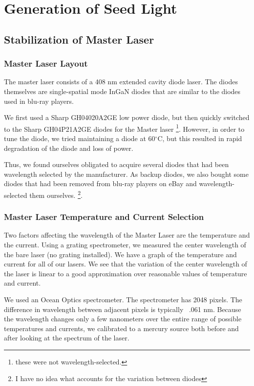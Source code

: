 \chapter{Generation of Seed Light}

\section{Stabilization of Master Laser}
\subsection{Master Laser Layout}
The master laser consists of a 408 nm extended cavity diode laser. The diodes themselves are single-spatial mode InGaN diodes that are similar to the diodes used in blu-ray players.

We first used a Sharp GH04020A2GE low power diode, but then quickly switched to the Sharp GH04P21A2GE diodes for the Master laser \footnote{these were not wavelength-selected.}. However, in order to tune the diode, we tried maintaining a diode at 60$^\circ$C, but this resulted in rapid degradation of the diode and loss of power. 

Thus, we found ourselves obligated to acquire several diodes that had been wavelength selected by the manufacturer. As backup diodes, we also bought some diodes that had been removed from blu-ray players on eBay and wavelength-selected them ourselves. \footnote{I have no idea what accounts for the variation between diodes}. 

\subsection{Master Laser Temperature and Current Selection}

Two factors affecting the wavelength of the Master Laser are the temperature and the current. Using a grating spectrometer, we measured the center wavelength of the bare laser (no grating installed). We have a graph of the temperature and current for all of our lasers. We see that the variation of the center wavelength of the laser is linear to a good approximation over reasonable values of temperature and current.

We used an Ocean Optics spectrometer. The spectrometer has 2048 pixels. The difference in wavelength between adjacent pixels is typically ~.061 nm. %
Because the wavelength changes only a few nanometers over the entire range of possible temperatures and currents, we calibrated to a mercury source both before and after looking at the spectrum of the laser. 

